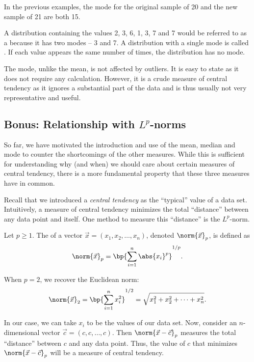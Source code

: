 In the previous examples, the mode for the original sample of 20 and the new sample of 21 are both 15.

A distribution containing the values 2, 3, 6, 1, 3, 7 and 7 would be referred to as a  because it has two modes -- 3 and 7. A distribution with a single mode is called . If each value appears the same number of times, the distribution has no mode.

The mode, unlike the mean, is not affected by outliers. It is easy to state as it does not require any calculation. However, it is a crude measure of central tendency as it ignores a substantial part of the data and is thus usually not very representative and useful.

\subsection{Bonus: Relationship with \texorpdfstring{$L^p$}{Lp}-norms}

So far, we have motivated the introduction and use of the mean, median and mode to counter the shortcomings of the other measures. While this is sufficient for understanding why (and when) we should care about certain measures of central tendency, there is a more fundamental property that these three measures have in common.

Recall that we introduced a \emph{central tendency} as the ``typical'' value of a data set. Intuitively, a measure of central tendency minimizes the total ``distance'' between any data point and itself. One method to measure this ``distance'' is the $L^p$-norm.

\begin{definition}
    Let $p \geq 1$. The  of a vector $\vec x = (x_1, x_2, \dots, x_n)$, denoted $\norm{\vec x}_p$, is defined as \[\norm{\vec x}_p = \bp{\sum_{i = 1}^n \abs{x_i}^p}^{1/p}.\]
\end{definition}

\begin{example}
    When $p = 2$, we recover the Euclidean norm: \[\norm{\vec x}_2 = \bp{\sum_{i = 1}^n x_i^2}^{1/2} = \sqrt{x_1^2 + x_2^2 + \dots + x_n^2}.\]
\end{example}

In our case, we can take $x_i$ to be the values of our data set. Now, consider an $n$-dimensional vector $\vec c = (c, c, \dots, c)$. Then $\norm{\vec x - \vec c}_p$ measures the total ``distance'' between $c$ and any data point. Thus, the value of $c$ that minimizes $\norm{\vec x - \vec c}_p$ will be a measure of central tendency.

